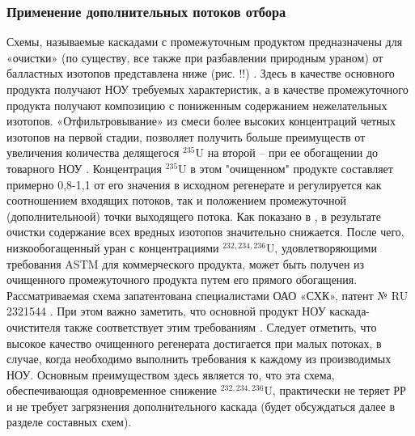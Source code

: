 \subsubsection{Применение дополнительных потоков отбора}
Схемы, называемые каскадами с промежуточным продуктом предназначены для «очистки» (по существу, все также при разбавлении природным ураном) от балластных изотопов представлена ниже (рис. !!) \cite{palkinAnaliticheskiyRaschetSoderzhaniya2007}. Здесь в качестве основного продукта получают НОУ требуемых характеристик, а в качестве промежуточного продукта получают композицию с пониженным содержанием нежелательных изотопов.
«Отфильтровывание» из смеси более высоких концентраций четных изотопов на первой стадии, позволяет получить больше преимуществ от увеличения количества делящегося $^{235}$U на второй -- при ее обогащении до товарного НОУ \cite{palkinSeparationUraniumIsotopes2010}.
Концентрация $^{235}$U в этом "очищенном" продукте составляет примерно 0,8-1,1 от его значения в исходном регенерате и регулируется как соотношением входящих потоков, так и положением промежуточной (дополнительноой) точки выходящего потока.
Как показано в \cite{palkinSeparationUraniumIsotopes2010}, в результате очистки содержание всех вредных изотопов значительно снижается. После чего, низкообогащенный уран с концентрациями $^{232,234,236}$U, удовлетворяющими требования ASTM для коммерческого продукта, может быть получен из очищенного промежуточного продукта путем его прямого обогащения. Рассматриваемая схема запатентована специалистами ОАО «СХК», патент № RU 2321544 \cite{shopenSposobPolucheniyaRazbavitelya2008}.
При этом важно заметить, что основной продукт НОУ каскада-очистителя также соответствует этим требованиям \cite{palkinSeparationUraniumIsotopes2010}. Следует отметить, что высокое качество очищенного регенерата достигается при малых потоках, в случае, когда необходимо выполнить требования к каждому из производимых НОУ.
Основным преимуществом здесь является то, что эта схема, обеспечивающая одновременное снижение $^{232,234,236}$U, практически не теряет РР и не требует загрязнения дополнительного каскада (будет обсуждаться далее в разделе составных схем).

